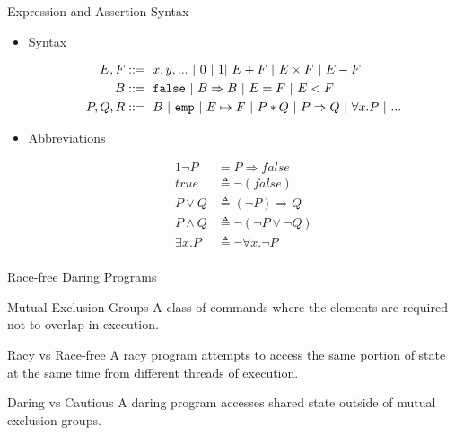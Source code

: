 \documentclass{beamer}
\newcommand{\btt}[1]{
  \mbox{\bm{$\mathtt{#1}$}}
}
\begin{document}
\begin{frame}{Expression and Assertion Syntax}
  \begin{itemize}
    \item {
      Syntax

      \begin{alignat*}{1}
        E, F &::=\ x, y, ...\ |\ 0\ |\ 1 |\ E + F\ |\ E \times F\ |\ E - F \\
        B &::=\ \btt{false}\ |\ B \Rightarrow B\ |\ E = F\ |\ E < F \\
        P, Q, R &::=\ B\ |\ \btt{emp}\ |\ E \mapsto F\ |\ P * Q\ |\ P \Rightarrow Q\ |\ \forall x.P\ |\ ...
      \end{alignat*}
    }

    \item {
      Abbreviations

      \begin{alignat*}{1}
        \neg P &= P \Rightarrow false\\
        true &\triangleq \neg(false)\\
        P \lor Q &\triangleq (\neg P) \Rightarrow Q\\
        P \land Q &\triangleq \neg (\neg P \lor \neg Q)\\
        \exists x. P &\triangleq \neg \forall x.\neg P \\
      \end{alignat*}
    }
  \end{itemize}
\end{frame}

\begin{frame}{Race-free Daring Programs}
  \begin{block}{Mutual Exclusion Groups}
    A class of commands where the elements are required not to overlap in execution.
  \end{block}

  \begin{block}{Racy vs Race-free}
    A racy program attempts to access the same portion of state at the same time from different threads of execution.
  \end{block}

  \begin{block}{Daring vs Cautious}
    A daring program accesses shared state outside of mutual exclusion groups.
  \end{block}
\end{frame}
\end{document}
